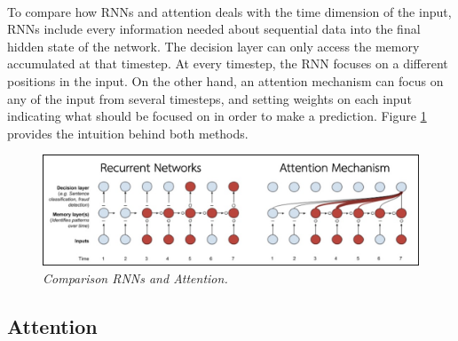 \paragraph{}
To compare how RNNs and attention deals with the time dimension of the input, RNNs include every information needed about sequential data into the final hidden state of the network. The decision layer can only access the memory accumulated at that timestep. At every timestep, the RNN focuses on a different positions in the input. On the other hand, an attention mechanism can focus on any of the input from several timesteps, and setting weights on each input indicating what should be focused on in order to make a prediction. Figure \ref{fig:rnnvsattention} provides the intuition behind both methods.

\begin{figure}[H]
  \centering
  \caption[Comparison RNNs and Attention.]{\emph{Comparison RNNs and Attention.}}\label{fig:rnnvsattention}
  \includegraphics[scale = 0.4
  ]{figures/rnnvsattention.jpg}  
\end{figure}
\subsection{Attention}
